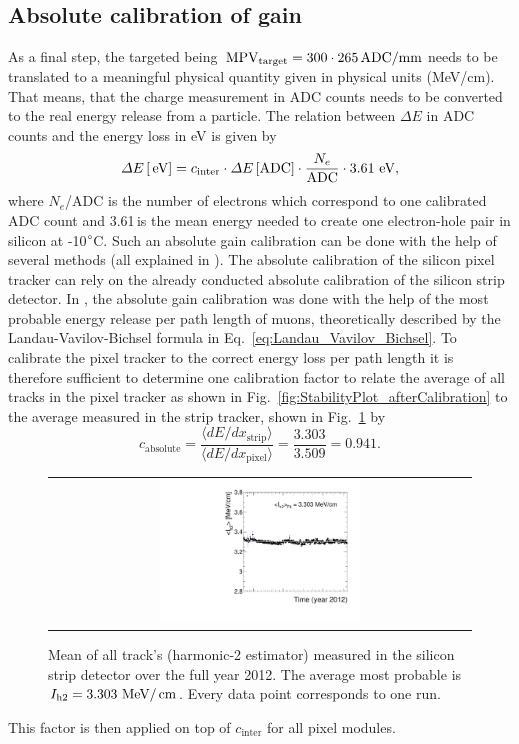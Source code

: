 \subsection*{Absolute calibration of gain}
As a final step, the targeted \mpv being $\,\text{MPV}_{\text{target}}=300 \cdot 265 \,  \text{ADC/mm}$ needs to be translated to a meaningful physical quantity given in physical units (\eg MeV/cm).
That means, that the charge measurement in ADC counts needs to be converted to the real energy release from a particle.
The relation between $\Delta E$ in ADC counts and the energy loss in eV is given by
\begin{equation}
\Delta E\,[\,\text{e}\kern-0.06667em\text{V}] = c_{\text{inter}} \cdot \Delta E\,[\text{ADC}] \cdot \frac{N_e}{\text{ADC}} \cdot 3.61 \, \,\text{e}\kern-0.06667em\text{V},
\end{equation}
where $N_e$/ADC is the number of electrons which correspond to one calibrated ADC count and 3.61\,\ev is the  mean energy needed to create one electron-hole pair in silicon at -10$\degree$C.
Such an absolute gain calibration can be done with the help of several methods (all explained in \cite{bib:Quertenmont_2010}).
The absolute calibration of the silicon pixel tracker can rely on the already conducted absolute calibration of the silicon strip detector.
In \cite{bib:Quertenmont_2010}, the absolute gain calibration was done with the help of the most probable energy release per path length of muons, 
theoretically described by the Landau-Vavilov-Bichsel formula in Eq.~\eqref{eq:Landau_Vavilov_Bichsel}.  
To calibrate the pixel tracker to the correct energy loss per path length it is therefore sufficient to determine one calibration factor to relate the average \dedx of all tracks in the pixel tracker as shown in 
Fig.~\ref{fig:StabilityPlot_afterCalibration} to the average measured \dedx in the strip tracker, shown in Fig.~\ref{fig:StabilityPlot_Strip} by
\begin{equation}
c_{\text{absolute}} = \frac{\langle dE/dx_{\text{strip}} \rangle}{\langle dE/dx_{\text{pixel}} \rangle} = \frac{3.303}{3.509} = 0.941.
\end{equation}
\begin{figure}[!b]
  \centering 
  \begin{tabular}{c}
  \includegraphics[width=0.49\textwidth]{figures/analysis/PixelCalibration/StabilityPlot_Strip_afterCalibration_withoutStepFits_NEW.pdf}
  \end{tabular}
  \caption{Mean of all track's \dedx (harmonic-2 estimator) measured in the silicon strip detector over the full year 2012. The average most probable \dedx is $I_{\text{h2}}=3.303\,\,\text{Me}\kern-0.06667em\text{V}/\,\text{cm}$. Every data point corresponds to one run.} 
  \label{fig:StabilityPlot_Strip}
\end{figure}
This factor is then applied on top of $c_{\text{inter}}$ for all pixel modules.

